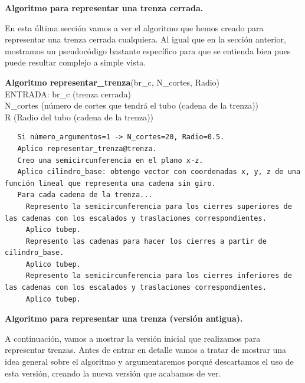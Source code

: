  \begin{center}
 	\textbf{Algoritmo para representar una trenza cerrada.}
 \end{center} 
 En esta última sección vamos a ver el algoritmo que hemos creado para representar una trenza cerrada cualquiera. Al igual que en la sección anterior, mostramos un pseudocódigo bastante específico para que se entienda bien pues puede resultar complejo a simple vista. 
\begin{alg}
	\textbf{Algoritmo representar\_trenza}(br\_c, N\_cortes, Radio)\\
	ENTRADA: br\_c (trenza cerrada)\\
	\hspace*{2.2cm} N\_cortes (número de cortes que tendrá el tubo (cadena de la trenza))\\
	\hspace*{2.2cm} R (Radio del tubo (cadena de la trenza))
	
\begin{lstlisting}
   Si número_argumentos=1 -> N_cortes=20, Radio=0.5.
   Aplico representar_trenza@trenza.
   Creo una semicircunferencia en el plano x-z.
   Aplico cilindro_base: obtengo vector con coordenadas x, y, z de una función lineal que representa una cadena sin giro.
   Para cada cadena de la trenza...
     Represento la semicircunferencia para los cierres superiores de las cadenas con los escalados y traslaciones correspondientes.
     Aplico tubep.
     Represento las cadenas para hacer los cierres a partir de cilindro_base.
     Aplico tubep.
     Represento la semicircunferencia para los cierres inferiores de las cadenas con los escalados y traslaciones correspondientes.
     Aplico tubep.
\end{lstlisting}
\end{alg}

\bigskip
 \begin{center}
 	\textbf{Algoritmo para representar una trenza (versión antigua).}
 \end{center}
A continuación, vamos a mostrar la versión inicial que realizamos para representar trenzas. Antes de entrar en detalle vamos a tratar de mostrar una idea general sobre el algoritmo y argumentaremos porqué descartamos el uso de esta versión, creando la nueva versión que acabamos de ver. \\

